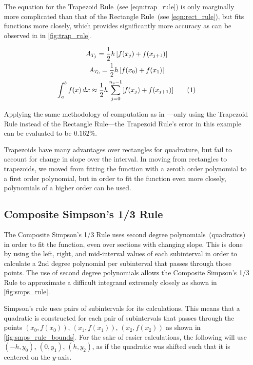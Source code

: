 \documentclass{paper}
\begin{document}
The equation for the Trapezoid Rule~(see \cref{eqn:trap_rule}) is only marginally more complicated than that of the Rectangle Rule~(see \cref{eqn:rect_rule}), but fits functions more closely, which provides significantly more accuracy as can be observed in in \cref{fig:trap_rule}.

\begin{gather*}
    A_{T_{j}} = \frac{1}{2} h \left[ f(x_{j}) + f(x_{j+1}) \right]                                                                                                \\
    A_{T_{0}} = \frac{1}{2} h \left[f(x_0) + f(x_1)\right]                                                                  \\
    \int_a^b f(x) \,dx \approx \frac{1}{2}h \sum^{n_s-1}_{j=0}[f(x_{j}) + f(x_{j+1})] \tageq\label{eqn:trap_rule} 
\end{gather*}



Applying the same methodology of computation as in ---only using the Trapezoid Rule instead of the Rectangle Rule---the Trapezoid Rule's error in this example can be evaluated to be \(0.162\%\).

Trapezoids have many advantages over rectangles for quadrature, but fail to account for change in slope over the interval.
In moving from rectangles to trapezoids, we moved from fitting the function with a zeroth order polynomial to a first order polynomial, but in order to fit the function even more closely, polynomials of a higher order can be used.

\subsection{Composite Simpson's 1/3 Rule}
\label{sec:smps_rule}
The Composite Simpson's 1/3 Rule uses second degree polynomials~(quadratics) in order to fit the function, even over sections with changing slope.
This is done by using the left, right, and mid-interval values of each subinterval in order to calculate a 2nd degree polynomial per subinterval that passes through those points.
The use of second degree polynomials allows the Composite Simpson's 1/3 Rule to approximate a difficult integrand extremely closely as shown in \cref{fig:smps_rule}.



Simpson's rule uses pairs of subintervals for its calculations.
This means that a quadratic is constructed for each pair of subintervals that passes through the points \((x_0, f(x_0))\), \((x_1, f(x_1))\), \((x_2, f(x_2))\) as shown in \cref{fig:smps_rule_bounds}.
For the sake of easier calculations, the following will use \((-h, y_0)\), \((0, y_1)\), \((h, y_2)\), as if the quadratic was shifted such that it is centered on the \(y\)-axis.
\end{document}
